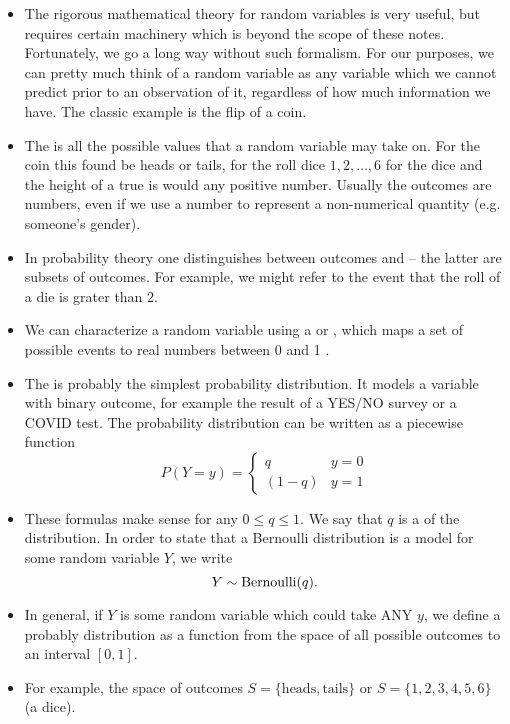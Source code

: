 \begin{itemize}
\item The rigorous mathematical theory for random variables is very useful, but requires certain machinery which is beyond the scope of these notes. Fortunately, we go a long way without such formalism. For our purposes, we can pretty much think of a random variable as any variable which we cannot predict prior to an observation of it, regardless of how much information we have. The classic example is the flip of a coin. 
\item The  is all the possible values that a random variable may take on. For the coin this found be heads or tails, for the roll dice $1,2,\dots,6$ for the dice and the height of a true is would any positive number.  Usually the outcomes are numbers, even if we use a number to represent a non-numerical quantity (e.g. someone's gender).
\item  In probability theory one distinguishes between outcomes and  -- the latter are subsets of outcomes. For example, we might refer to the event that the roll of a die is grater than $2$. 
\item We can characterize a random variable using  a  or , which maps a set of possible events to real numbers between 0 and 1 \cite[Definition 1.2.1]{tabak}. 
\item  The  \cite[Example 2.3.2]{tabak} is probably the simplest probability distribution. It models a variable with binary outcome, for example the result of a YES/NO survey or a COVID test. 
The probability distribution can be written as a piecewise function 
\begin{equation}\label{eq:pmbern}
P(Y=y) = \left\{\begin{array}{lr} q & y=0\\ (1-q) & y= 1 \end{array}\right.
\end{equation}
\item These formulas make sense for any $0\le q\le1$. We say that $q$ is a  of the distribution. 
In order to state that a Bernoulli distribution is a model for some random variable $Y$, we write
\begin{equation}
Y \sim {\rm Bernoulli}(q).
\end{equation}
\item In general, if $Y$ is some random variable which could take ANY $y$, we define a probably distribution as a function from the space of all possible outcomes to an interval $[0,1]$. 
\item For example,  the space of outcomes $S = \{\text{heads},\text{tails}\}$ or $S = \{1,2,3,4,5,6\}$ (a dice).  
\end{itemize}

